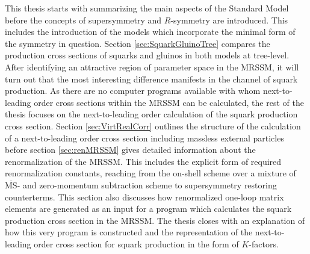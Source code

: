 This thesis starts with summarizing the main aspects of the Standard Model before the concepts of supersymmetry and $R$-symmetry are introduced. This includes the introduction of the models which incorporate the minimal form of the symmetry in question. Section \ref{sec:SquarkGluinoTree} compares the production cross sections of squarks and gluinos in both models at \mbox{tree-level}. After identifying an attractive region of parameter space in the MRSSM, it will turn out that the most interesting difference manifests in the channel of squark production. As there are no computer programs available with whom next-to-leading order cross sections within the MRSSM can be calculated, the rest of the thesis focuses on the next-to-leading order calculation of the squark production cross section. Section \ref{sec:VirtRealCorr} outlines the structure of the calculation of a next-to-leading order cross section including massless external particles before section \ref{sec:renMRSSM} gives detailed information about the renormalization of the MRSSM. This includes the explicit form of required renormalization constants, reaching from the on-shell scheme over a mixture of $\overline{\mathrm{MS}}$- and zero-momentum subtraction scheme to supersymmetry restoring counterterms. This section also discusses how renormalized one-loop matrix elements are generated as an input for a program which calculates the squark production cross section in the MRSSM.
The thesis closes with an explanation of how this very program is constructed and the representation of the next-to-leading order cross section for squark production in the form of $K$-factors.

